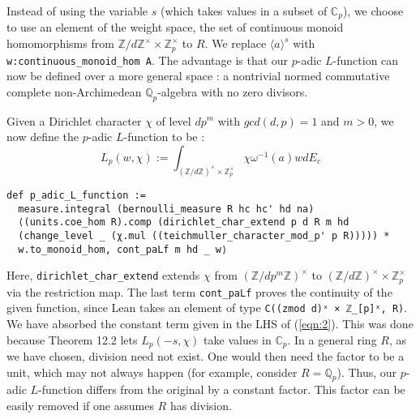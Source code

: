 \documentclass[a4paper,UKenglish,cleveref, autoref, thm-restate]{lipics-v2021}
\newcommand{\lean}[1]{\texttt{#1}\xspace} %
\begin{document}
Instead of using the variable $s$ (which takes values in a subset of $\mathbb{C}_p$), we choose to use an element of the weight space, 
the set of continuous monoid homomorphisms from $\mathbb{Z}/d\mathbb{Z}^{\times} \times \mathbb{Z}_p^{\times}$ to $R$. We replace
$\langle a \rangle ^s$ with \lean{w:continuous\_monoid\_hom A}. The advantage is that our $p$-adic $L$-function can now be defined over a more general space : 
a nontrivial normed commutative complete non-Archimedean $\mathbb{Q}_p$-algebra with no zero divisors. 

Given a Dirichlet character $\chi$ of level $dp^m$ with $gcd(d, p) = 1$ and $m > 0$,
we now define the $p$-adic $L$-function to be : %
$$ L_p(w, \chi) := \int_{(\mathbb{Z}/d \mathbb{Z})^{\times} \times \mathbb{Z}_p^{\times}}
\chi \omega^{-1}(a) w dE_c $$
\begin{lstlisting}
def p_adic_L_function := 
  measure.integral (bernoulli_measure R hc hc' hd na)
  ⟨(units.coe_hom R).comp (dirichlet_char_extend p d R m hd 
  (change_level _ (χ.mul ((teichmuller_character_mod_p' p R))))) * 
  w.to_monoid_hom, cont_paLf m hd _ w⟩
\end{lstlisting}
Here, \lean{dirichlet\_char\_extend} extends $\chi$ from $(\mathbb{Z}/ dp^m \mathbb{Z})^{\times}$ to 
$(\mathbb{Z}/ d \mathbb{Z})^{\times} \times \mathbb{Z}_p^{\times}$ via the restriction map. The last term 
\lean{cont\_paLf} proves the continuity of the given function, since Lean takes an element of type \lean{C((zmod d)ˣ × ℤ\_[p]ˣ, R)}. 
We have absorbed the constant term given in the LHS of (\ref{eqn:2}). This was done because Theorem 12.2 
lets $L_p(-s, \chi)$ take values in $\mathbb{C}_p$. 
In a general ring $R$, as we have chosen, division need not exist. One would then need the factor to be a unit, which may not always happen 
(for example, consider $R = \mathbb{Q}_p$). Thus, our $p$-adic $L$-function differs from the original by a constant factor. 
This factor can be easily removed if one assumes $R$ has division. 

\end{document}
